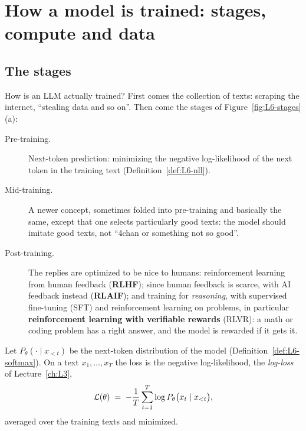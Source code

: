 \section{How a model is trained: stages, compute and data}\label{sec:L6-train}
\subsection{The stages}\label{sec:L6-stages}
How is an LLM actually trained? First comes the collection of texts: scraping the internet, ``stealing data and so on''. Then come the stages of Figure~\ref{fig:L6-stages}(a):
\begin{description}
  \item[Pre-training.] Next-token prediction: minimizing the negative log-likelihood of the next token in the training text (Definition~\ref{def:L6-nll}).
  \item[Mid-training.] A newer concept, sometimes folded into pre-training and basically the same, except that one selects particularly good texts: the model should imitate good texts, not ``4chan or something not so good''.
  \item[Post-training.] The replies are optimized to be nice to humans: reinforcement learning from human feedback (\textbf{RLHF}); since human feedback is scarce, with AI feedback instead (\textbf{RLAIF}); and training for \emph{reasoning}, with supervised fine-tuning (SFT) and reinforcement learning on problems, in particular \textbf{reinforcement learning with verifiable rewards} (RLVR): a math or coding problem has a right answer, and the model is rewarded if it gets it.
\end{description}

\begin{defn}\label{def:L6-nll}
Let $P_\theta(\cdot\mid x_{<t})$ be the next-token distribution of the model (Definition~\ref{def:L6-softmax}). On a text $x_1,\dots,x_T$ the loss is the negative log-likelihood, the \emph{log-loss} of Lecture~\ref{ch:L3},
\[
  \mathcal{L}(\theta)\;=\;-\frac1T\sum_{t=1}^{T}\log P_\theta\big(x_t\mid x_{<t}\big),
\]
averaged over the training texts and minimized.
\end{defn}

